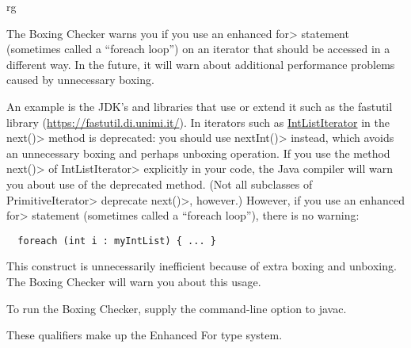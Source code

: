 rg\htmlhr
{}

The Boxing Checker warns you if you use an enhanced \<for> statement
(sometimes called a ``foreach loop'') on an iterator that should be
accessed in a different way.
In the future, it will warn about additional performance problems caused by
unnecessary boxing.

An example is the JDK's
and libraries that use or extend it such as the fastutil library (\url{https://fastutil.di.unimi.it/}).
In iterators such as 
\href{https://fastutil.di.unimi.it/docs/it/unimi/dsi/fastutil/ints/IntListIterator.html}{\<IntListIterator\>}
in the \<next()> method is deprecated:  you should use \<nextInt()> instead,
which avoids an unnecessary boxing and perhaps unboxing operation.  If you use the
method \<next()> of \<IntListIterator> explicitly in your code, the Java compiler will warn you
about use of the deprecated method.  (Not all subclasses of
\<PrimitiveIterator> deprecate \<next()>, however.)
However, if you use an enhanced \<for> statement (sometimes called a ``foreach
loop''), there is no warning:

\begin{Verbatim}
  foreach (int i : myIntList) { ... }
\end{Verbatim}

\noindent
This construct is unnecessarily inefficient because of extra boxing and unboxing.
The Boxing Checker will warn you about this usage.

To run the Boxing Checker, supply the
command-line option to javac.



These qualifiers make up the Enhanced For type system.

